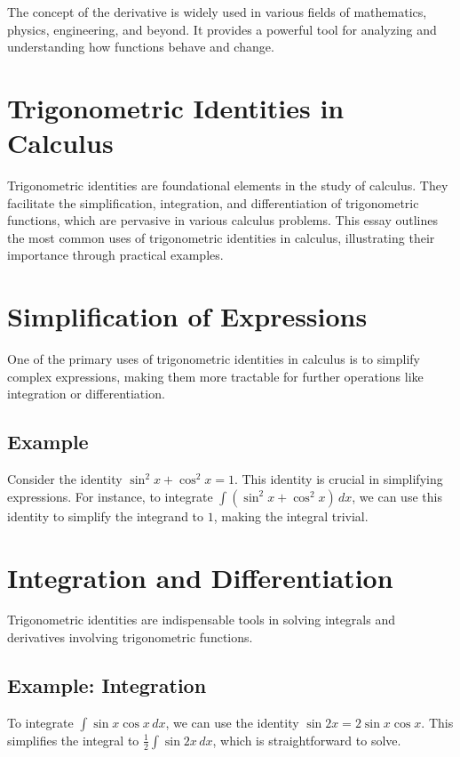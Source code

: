 \documentclass[a4paper,12pt]{book}
\newcounter{problem}
\newcounter{example}
\begin{document}
The concept of the derivative is widely used in various fields of mathematics, physics, engineering, and beyond. It provides a powerful tool for analyzing and understanding how functions behave and change.




\section*{Trigonometric Identities in Calculus}
Trigonometric identities are foundational elements in the study of calculus. They facilitate the simplification, integration, and differentiation of trigonometric functions, which are pervasive in various calculus problems. This essay outlines the most common uses of trigonometric identities in calculus, illustrating their importance through practical examples.

\section{Simplification of Expressions}
One of the primary uses of trigonometric identities in calculus is to simplify complex expressions, making them more tractable for further operations like integration or differentiation.

\subsection*{Example}
Consider the identity $\sin^2 x + \cos^2 x = 1$. This identity is crucial in simplifying expressions. For instance, to integrate $\int (\sin^2 x + \cos^2 x) \, dx$, we can use this identity to simplify the integrand to $1$, making the integral trivial.

\section{Integration and Differentiation}
Trigonometric identities are indispensable tools in solving integrals and derivatives involving trigonometric functions.

\subsection*{Example: Integration}
To integrate $\int \sin x \cos x \, dx$, we can use the identity $\sin 2x = 2 \sin x \cos x$. This simplifies the integral to $\frac{1}{2} \int \sin 2x \, dx$, which is straightforward to solve.
\end{document}
